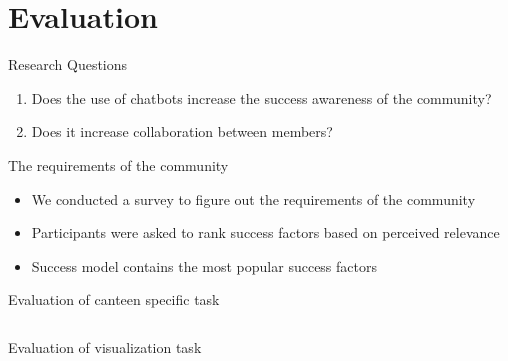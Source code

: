 \section{Evaluation}
\begin{frame}{Research Questions}
  \begin{enumerate}
    \item Does the use of chatbots increase the success awareness of the community?
    \item Does it increase collaboration between members?
  \end{enumerate}
\end{frame}


\begin{frame}{The requirements of the community}
  \begin{itemize}
    \item We conducted a survey to figure out the requirements of the community
    \item Participants were asked to rank success factors based on perceived relevance
    \item Success model contains the most popular success factors
  \end{itemize}
\end{frame}

\begin{frame}{Evaluation of canteen specific task}
  \begin{columns}
    \begin{column}[t]{0.5\textwidth}
      
    \end{column}
    \begin{column}[t]{0.5\textwidth}
      
    \end{column}
  \end{columns}
\end{frame}

\begin{frame}{Evaluation of visualization task}
  \begin{columns}
    \begin{column}[t]{0.5\textwidth}
      
    \end{column}
    \begin{column}[t]{0.5\textwidth}
      
    \end{column}
  \end{columns}
\end{frame}


